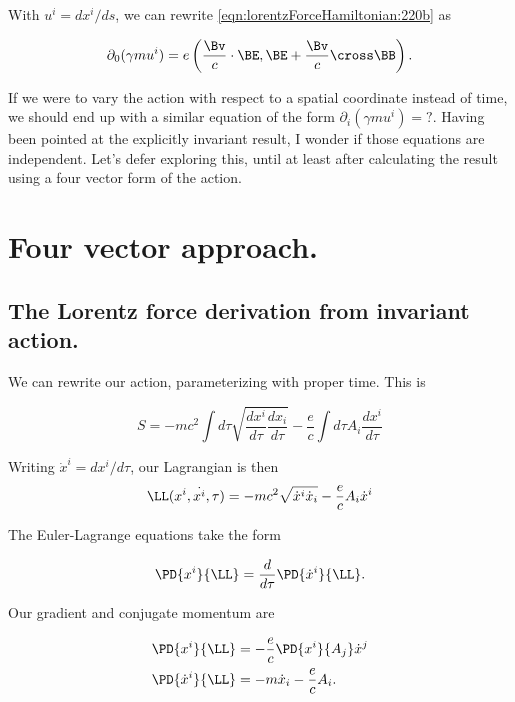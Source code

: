 With $u^i = dx^i/ds$, we can rewrite \ref{eqn:lorentzForceHamiltonian:220b} as

\begin{equation}\label{eqn:lorentzForceHamiltonian:230}
\partial_0 (\gamma m u^i) 
= e \left( \frac{\Bv}{c} \cdot \BE, \BE + \frac{\Bv}{c} \cross \BB \right).
\end{equation}

If we were to vary the action with respect to a spatial coordinate instead of time, we should end up with a similar equation of the form $\partial_i (\gamma m u^i) = ?$.  Having been pointed at the explicitly invariant result, I wonder if those equations are independent.  Let's defer exploring this, until at least after calculating the result using a four vector form of the action.

\section{Four vector approach.}
\subsection{The Lorentz force derivation from invariant action.}

We can rewrite our action, parameterizing with proper time.  This is

\begin{equation}\label{eqn:lorentzForceHamiltonian:240}
S = -m c^2 \int d\tau \sqrt{ \frac{dx^i}{d\tau} \frac{dx_i}{d\tau} }
- \frac{e}{c} \int d\tau A_i \frac{dx^i}{d\tau}
\end{equation}

Writing $\dot{x}^i = dx^i/d\tau$, our Lagrangian is then
\begin{equation}\label{eqn:lorentzForceHamiltonian:250}
\LL(x^i, \dot{x^i}, \tau)
= -m c^2 \sqrt{ \dot{x}^i \dot{x}_i }
- \frac{e}{c} A_i \dot{x}^i
\end{equation}

The Euler-Lagrange equations take the form

\begin{equation}\label{eqn:lorentzForceHamiltonian:255}
\PD{x^i}{\LL} 
= 
\frac{d}{d\tau} \PD{\dot{x}^i}{\LL} .
\end{equation}

Our gradient and conjugate momentum are

\begin{align}\label{eqn:lorentzForceHamiltonian:260}
\PD{x^i}{\LL} 
&= - \frac{e}{c} \PD{x^i}{A_j} \dot{x}^j  \\
\PD{\dot{x}^i}{\LL}  
&= -m \dot{x}_i - \frac{e}{c} A_i.
\end{align}


